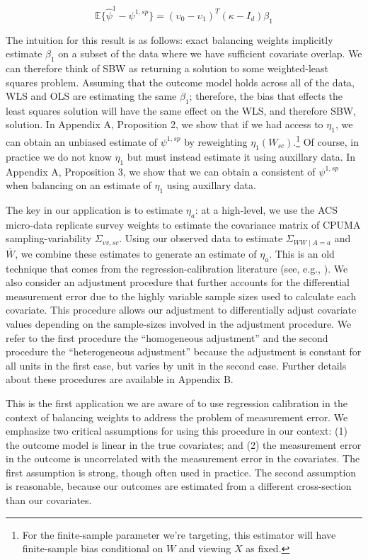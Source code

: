 \begin{equation}
\mathbb{E}\{\hat{\psi}^{1} - \psi^{1, sp}\} = (\upsilon_0 - \upsilon_1)^T(\kappa - I_d)\beta_1
\end{equation}

The intuition for this result is as follows: exact balancing weights implicitly estimate $\beta_1$ on a subset of the data where we have sufficient covariate overlap. We can therefore think of SBW as returning a solution to some weighted-least squares problem. Assuming that the outcome model holds across all of the data, WLS and OLS are estimating the same $\beta_1$; therefore, the bias that effects the least squares solution will have the same effect on the WLS, and therefore SBW, solution. In Appendix A, Proposition 2, we show that if we had access to $\eta_1$, we can obtain an unbiased estimate of $\psi^{1, sp}$ by reweighting $\eta_1(W_{sc})$.\footnote{For the finite-sample parameter we're targeting, this estimator will have finite-sample bias conditional on $W$ and viewing $X$ as fixed.} Of course, in practice we do not know $\eta_1$ but must instead estimate it using auxillary data. In Appendix A, Proposition 3, we show that we can obtain a consistent of $\psi^{1, sp}$ when balancing on an estimate of $\eta_1$ using auxillary data. 

The key in our application is to estimate $\eta_a$: at a high-level, we use the ACS micro-data replicate survey weights to estimate the covariance matrix of CPUMA sampling-variability $\Sigma_{vv, sc}$. Using our observed data to estimate $\Sigma_{WW \mid A = a}$ and $\bar{W}$, we combine these estimates to generate an estimate of $\eta_a$. This is an old technique that comes from the regression-calibration literature (see, e.g., \cite{gleser1992importance}). We also consider an adjustment procedure that further accounts for the differential measurement error due to the highly variable sample sizes used to calculate each covariate. This procedure allows our adjustment to differentially adjust covariate values depending on the sample-sizes involved in the adjustment procedure. We refer to the first procedure the ``homogeneous adjustment'' and the second procedure the ``heterogeneous adjustment'' because the adjustment is constant for all units in the first case, but varies by unit in the second case. Further details about these procedures are available in Appendix B.

This is the first application we are aware of to use regression calibration in the context of balancing weights to address the problem of measurement error. We emphasize two critical assumptions for using this procedure in our context: (1) the outcome model is linear in the true covariates; and (2) the measurement error in the outcome is uncorrelated with the measurement error in the covariates. The first assumption is strong, though often used in practice. The second assumption is reasonable, because our outcomes are estimated from a different cross-section than our covariates. 

